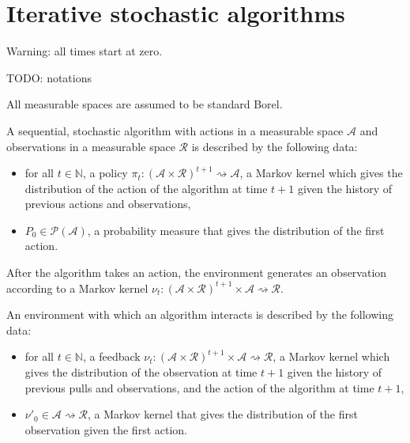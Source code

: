 \chapter{Iterative stochastic algorithms}


Warning: all times start at zero.

TODO: notations

All measurable spaces are assumed to be standard Borel.


\begin{definition}[Algorithm]\label{def:algorithm}
  \leanok
A sequential, stochastic algorithm with actions in a measurable space $\mathcal{A}$ and observations in a measurable space $\mathcal{R}$ is described by the following data:
\begin{itemize}
  \item for all $t \in \mathbb{N}$, a policy $\pi_t : (\mathcal{A} \times \mathcal{R})^{t+1} \rightsquigarrow \mathcal{A}$, a Markov kernel which gives the distribution of the action of the algorithm at time $t+1$ given the history of previous actions and observations,
  \item $P_0 \in \mathcal{P}(\mathcal{A})$, a probability measure that gives the distribution of the first action.
\end{itemize}
\end{definition}

After the algorithm takes an action, the environment generates an observation according to a Markov kernel $\nu_t : (\mathcal{A} \times \mathcal{R})^{t+1} \times \mathcal{A} \rightsquigarrow \mathcal{R}$.


\begin{definition}[Environment]\label{def:environment}
  \leanok
An environment with which an algorithm interacts is described by the following data:
\begin{itemize}
  \item for all $t \in \mathbb{N}$, a feedback $\nu_t : (\mathcal{A} \times \mathcal{R})^{t+1} \times \mathcal{A} \rightsquigarrow \mathcal{R}$, a Markov kernel which gives the distribution of the observation at time $t+1$ given the history of previous pulls and observations, and the action of the algorithm at time $t+1$,
  \item $\nu'_0 \in \mathcal{A} \rightsquigarrow \mathcal{R}$, a Markov kernel that gives the distribution of the first observation given the first action.
\end{itemize}
\end{definition}



